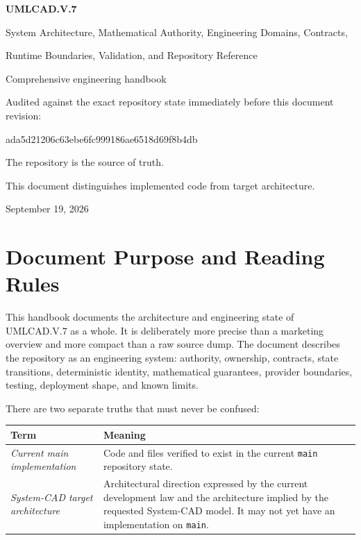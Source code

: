 \documentclass[11pt,a4paper]{report}
\newcommand{\current}{\textit{Current main implementation}}
\newcommand{\target}{\textit{System-CAD target architecture}}
\begin{document}
\begin{titlepage}
\centering
\vspace*{18mm}
{\Huge\bfseries UMLCAD.V.7\par}
\vspace{5mm}
{\LARGE System Architecture, Mathematical Authority, Engineering Domains, Contracts,\par}
{\LARGE Runtime Boundaries, Validation, and Repository Reference\par}
\vspace{15mm}
{\large Comprehensive engineering handbook\par}
\vspace{6mm}
{\large Audited against the exact repository state immediately before this document revision:\par}
\vspace{2mm}
{\ttfamily ada5d21206c63ebe6fc999186ae6518d69f8b4db\par}
\vfill
{\large The repository is the source of truth.\par}
{\large This document distinguishes implemented code from target architecture.\par}
\vspace{8mm}
{\large September 19, 2026\par}
\end{titlepage}

\tableofcontents
\clearpage

\chapter{Document Purpose and Reading Rules}

This handbook documents the architecture and engineering state of UMLCAD.V.7 as a whole. It is deliberately more precise than a marketing overview and more compact than a raw source dump. The document describes the repository as an engineering system: authority, ownership, contracts, state transitions, deterministic identity, mathematical guarantees, provider boundaries, testing, deployment shape, and known limits.

There are two separate truths that must never be confused:

\begin{tabularx}{\textwidth}{@{}p{}X@{}}
\toprule
Term & Meaning \\
\midrule
\current & Code and files verified to exist in the current \texttt{main} repository state. \\
\target & Architectural direction expressed by the current development law and the architecture implied by the requested System-CAD model. It may not yet have an implementation on \texttt{main}. \\
\bottomrule
\end{tabularx}
\end{document}
